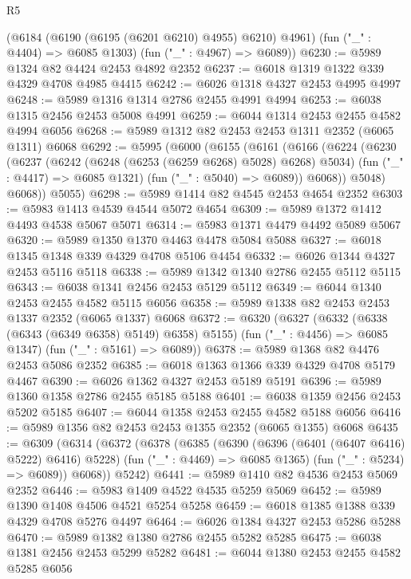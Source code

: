 \begin{lexlean}{R5}
\begin{coremodule}
      (@6184 (@6190 (@6195 (@6201 @6210) @4955) @6210) @4961)
      (fun ("_" : @4404) => @6085 @1303)
      (fun ("_" : @4967) => @6089))
@6230 := @5989 @1324 @82 @4424 @2453 @4892 @2352
@6237 := @6018 @1319 @1322 @339 @4329 @4708 @4985 @4415
@6242 := @6026 @1318 @4327 @2453 @4995 @4997
@6248 := @5989 @1316 @1314 @2786 @2455 @4991 @4994
@6253 := @6038 @1315 @2456 @2453 @5008 @4991
@6259 := @6044 @1314 @2453 @2455 @4582 @4994 @6056
@6268 := @5989 @1312 @82 @2453 @2453 @1311 @2352 (@6065 @1311) @6068
@6292 := @5995
    (@6000
      (@6155
        (@6161
          (@6166
            (@6224
              (@6230
                (@6237
                  (@6242 (@6248 (@6253 (@6259 @6268) @5028) @6268) @5034)
                  (fun ("_" : @4417) => @6085 @1321)
                  (fun ("_" : @5040) => @6089))
                @6068))
            @5048)
          @6068))
      @5055)
@6298 := @5989 @1414 @82 @4545 @2453 @4654 @2352
@6303 := @5983 @1413 @4539 @4544 @5072 @4654
@6309 := @5989 @1372 @1412 @4493 @4538 @5067 @5071
@6314 := @5983 @1371 @4479 @4492 @5089 @5067
@6320 := @5989 @1350 @1370 @4463 @4478 @5084 @5088
@6327 := @6018 @1345 @1348 @339 @4329 @4708 @5106 @4454
@6332 := @6026 @1344 @4327 @2453 @5116 @5118
@6338 := @5989 @1342 @1340 @2786 @2455 @5112 @5115
@6343 := @6038 @1341 @2456 @2453 @5129 @5112
@6349 := @6044 @1340 @2453 @2455 @4582 @5115 @6056
@6358 := @5989 @1338 @82 @2453 @2453 @1337 @2352 (@6065 @1337) @6068
@6372 := @6320
    (@6327
      (@6332 (@6338 (@6343 (@6349 @6358) @5149) @6358) @5155)
      (fun ("_" : @4456) => @6085 @1347)
      (fun ("_" : @5161) => @6089))
@6378 := @5989 @1368 @82 @4476 @2453 @5086 @2352
@6385 := @6018 @1363 @1366 @339 @4329 @4708 @5179 @4467
@6390 := @6026 @1362 @4327 @2453 @5189 @5191
@6396 := @5989 @1360 @1358 @2786 @2455 @5185 @5188
@6401 := @6038 @1359 @2456 @2453 @5202 @5185
@6407 := @6044 @1358 @2453 @2455 @4582 @5188 @6056
@6416 := @5989 @1356 @82 @2453 @2453 @1355 @2352 (@6065 @1355) @6068
@6435 := @6309
    (@6314
      (@6372
        (@6378
          (@6385
            (@6390 (@6396 (@6401 (@6407 @6416) @5222) @6416) @5228)
            (fun ("_" : @4469) => @6085 @1365)
            (fun ("_" : @5234) => @6089))
          @6068))
      @5242)
@6441 := @5989 @1410 @82 @4536 @2453 @5069 @2352
@6446 := @5983 @1409 @4522 @4535 @5259 @5069
@6452 := @5989 @1390 @1408 @4506 @4521 @5254 @5258
@6459 := @6018 @1385 @1388 @339 @4329 @4708 @5276 @4497
@6464 := @6026 @1384 @4327 @2453 @5286 @5288
@6470 := @5989 @1382 @1380 @2786 @2455 @5282 @5285
@6475 := @6038 @1381 @2456 @2453 @5299 @5282
@6481 := @6044 @1380 @2453 @2455 @4582 @5285 @6056

\end{coremodule}
\end{lexlean}
